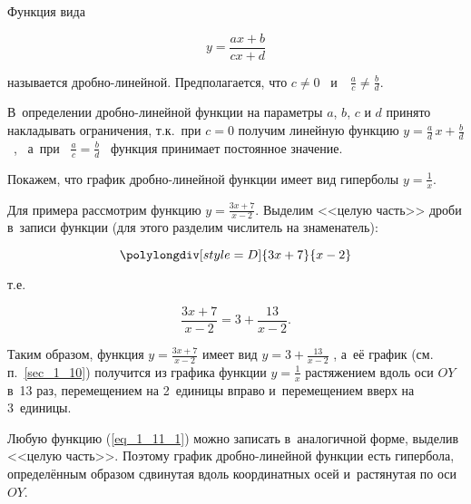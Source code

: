 \begin{Def}
Функция вида

\begin{equation}\label{eq_1_11_1}
y = \frac{ax + b}{cx + d}
\end{equation}

называется дробно-линейной.
Предполагается, что $c \ne 0$ \, и~\, $\displaystyle \frac{a}{c} \ne \frac{b}{d}$.
\end{Def}

В~определении дробно-линейной функции на параметры $a$, $b$, $c$ и $d$
принято накладывать ограничения, т.к.\ при $c = 0$ получим линейную функцию
$\displaystyle y = \frac{a}{d} \, x + \frac{b}{d}$ \, , \,
а~при \, $\displaystyle \frac{a}{c} = \frac{b}{d}$ \,
функция принимает постоянное значение.

Покажем, что график дробно-линейной функции имеет вид гиперболы
$\displaystyle y = \frac{1}{x}$.

Для примера рассмотрим функцию $\displaystyle y = \frac{3x + 7}{x - 2}$.
Выделим <<целую часть>> дроби в~записи функции (для этого разделим
числитель на знаменатель):

\begin{equation*}
\polylongdiv[style=D]{3x+7}{x-2}
\end{equation*}

т.е.\

\begin{equation*}
\frac{3x + 7}{x - 2} = 3 + \frac{13}{x - 2}.
\end{equation*}

Таким образом, функция $\displaystyle y = \frac{3x + 7}{x - 2}$
имеет вид $\displaystyle y = 3 + \frac{13}{x - 2}$ ,
а~её график (см. п.\ \ref{sec_1_10}) получится из графика функции
$\displaystyle y = \frac{1}{x}$ растяжением вдоль оси $OY$ в~13 раз,
перемещением на 2~единицы вправо и~перемещением вверх на 3~единицы.

Любую функцию (\ref{eq_1_11_1}) можно записать в~аналогичной форме,
выделив <<целую часть>>. Поэтому график дробно-линейной функции
есть гипербола, определённым образом сдвинутая вдоль координатных осей
и~растянутая по оси $OY$.
